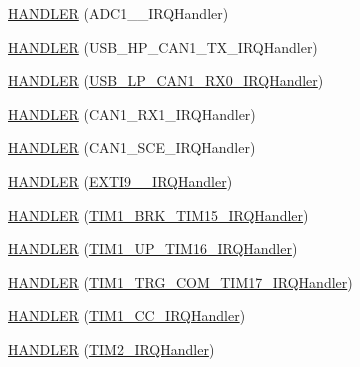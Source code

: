 \begin{DoxyCompactItemize}
\item 
\hyperlink{group___p_i_o_s_ga26b03512a0e5375eee51ef8d4b03c748}{H\-A\-N\-D\-L\-E\-R} (A\-D\-C1\-\_\-\_\-\-I\-R\-Q\-Handler)
\item 
\hyperlink{group___p_i_o_s_gae24dca6ba50882215c910dcf23a3ef10}{H\-A\-N\-D\-L\-E\-R} (U\-S\-B\-\_\-\-H\-P\-\_\-\-C\-A\-N1\-\_\-\-T\-X\-\_\-\-I\-R\-Q\-Handler)
\item 
\hyperlink{group___p_i_o_s_ga46ab0ef22d9e34e51ecb3f08ab2a3a8b}{H\-A\-N\-D\-L\-E\-R} (\hyperlink{_s_t_m32_f30x_2pios__usb__hid__istr_8c_af57bde854fa2b396f29664995a502b19}{U\-S\-B\-\_\-\-L\-P\-\_\-\-C\-A\-N1\-\_\-\-R\-X0\-\_\-\-I\-R\-Q\-Handler})
\item 
\hyperlink{group___p_i_o_s_gae1b19bec9df0a07c35af20be43d4afa4}{H\-A\-N\-D\-L\-E\-R} (C\-A\-N1\-\_\-\-R\-X1\-\_\-\-I\-R\-Q\-Handler)
\item 
\hyperlink{group___p_i_o_s_gaf3bd936674d03387b3fbc7b23ac49493}{H\-A\-N\-D\-L\-E\-R} (C\-A\-N1\-\_\-\-S\-C\-E\-\_\-\-I\-R\-Q\-Handler)
\item 
\hyperlink{group___p_i_o_s_ga8e7e5161f04ddaad1a46275ef60af5b3}{H\-A\-N\-D\-L\-E\-R} (\hyperlink{group___p_i_o_s___e_x_t_i_ga7b2096b8b2643286dc3a7e5110e5ae85}{E\-X\-T\-I9\-\_\-\_\-\-I\-R\-Q\-Handler})
\item 
\hyperlink{group___p_i_o_s_gaef5ecd9aa5c79599d6e13d627bccd933}{H\-A\-N\-D\-L\-E\-R} (\hyperlink{group___p_i_o_s___t_i_m_ga37c3c8d5fe4f0106410dea2c1147b8a9}{T\-I\-M1\-\_\-\-B\-R\-K\-\_\-\-T\-I\-M15\-\_\-\-I\-R\-Q\-Handler})
\item 
\hyperlink{group___p_i_o_s_gad074af2e425b95b58e889f27da54ae7b}{H\-A\-N\-D\-L\-E\-R} (\hyperlink{group___p_i_o_s___t_i_m_gab19e96bc9fe4483b9fdf25047c61238e}{T\-I\-M1\-\_\-\-U\-P\-\_\-\-T\-I\-M16\-\_\-\-I\-R\-Q\-Handler})
\item 
\hyperlink{group___p_i_o_s_ga0be5a32ba5788641eb2e9dead9bf6fc0}{H\-A\-N\-D\-L\-E\-R} (\hyperlink{group___p_i_o_s___t_i_m_gaa96795d8fb4793f60135fad74ecb1d70}{T\-I\-M1\-\_\-\-T\-R\-G\-\_\-\-C\-O\-M\-\_\-\-T\-I\-M17\-\_\-\-I\-R\-Q\-Handler})
\item 
\hyperlink{group___p_i_o_s_gab03e032732f0ad22dc58da2637c4eb07}{H\-A\-N\-D\-L\-E\-R} (\hyperlink{group___p_i_o_s___t_i_m_gae8a61b27afdb07c70d6b863c44284ca6}{T\-I\-M1\-\_\-\-C\-C\-\_\-\-I\-R\-Q\-Handler})
\item 
\hyperlink{group___p_i_o_s_ga390d635886c3450d24f41c93d01afa93}{H\-A\-N\-D\-L\-E\-R} (\hyperlink{group___p_i_o_s___t_i_m_ga38ad4725462bdc5e86c4ead4f04b9fc2}{T\-I\-M2\-\_\-\-I\-R\-Q\-Handler})
\item 

\end{DoxyCompactItemize}

